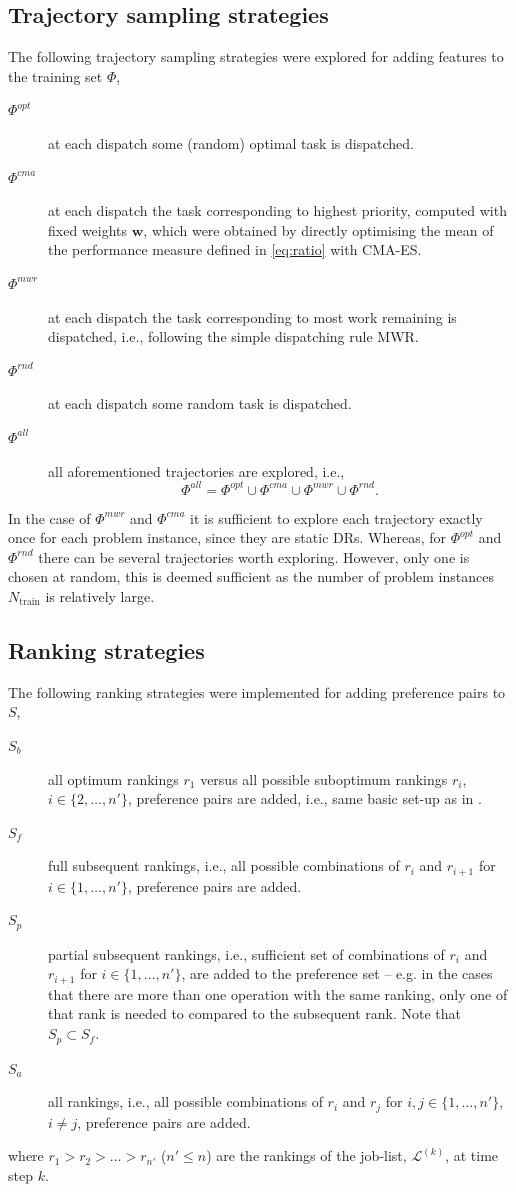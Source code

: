 \documentclass[smallextended]{llncs}
\renewcommand{\vec}[1]{\mathbf{#1}}
\begin{document}
\subsection{Trajectory sampling strategies}\label{sec:tracks}
The following trajectory sampling strategies were explored for adding features to the training set $\Phi$,
\begin{description}
\item[$\Phi^{opt}$] at each dispatch some (random) optimal task is dispatched.
\item[$\Phi^{cma}$] at each dispatch the task corresponding to highest priority, computed with fixed weights $\vec{w}$, which were obtained by directly optimising the mean of the performance measure defined in \cref{eq:ratio} with CMA-ES. 
\item[$\Phi^{mwr}$] at each dispatch the task corresponding to most work remaining is dispatched, i.e., following the simple dispatching rule MWR.
\item[$\Phi^{rnd}$] at each dispatch some random task is dispatched.
\item[$\Phi^{all}$] all aforementioned trajectories are explored, i.e., $$\Phi^{all}=\Phi^{opt}\cup \Phi^{cma}\cup \Phi^{mwr} \cup \Phi^{rnd}.$$
\end{description}
In the case of $\Phi^{mwr}$ and $\Phi^{cma}$ it is sufficient to explore each trajectory exactly once for each problem instance, since they are static DRs. Whereas, for $\Phi^{opt}$ and $\Phi^{rnd}$ there can be several trajectories worth exploring. However, only one is chosen at random, this is deemed sufficient as the number of problem instances $N_{\text{train}}$ is relatively large.

\subsection{Ranking strategies}\label{sec:ranks}
The following ranking strategies were implemented for adding preference pairs to $S$,
\begin{description}
\item[$S_b$] all optimum rankings $r_1$ versus all possible suboptimum rankings $r_i$, $i\in\{2,\ldots,n'\}$, preference pairs are added, i.e., same basic set-up as in \cite{InRu11a}. %
\item[$S_f$] full subsequent rankings, i.e., all possible combinations of $r_i$ and $r_{i+1}$ for $i\in\{1,\ldots,n'\}$, preference pairs are added.
\item[$S_p$] partial subsequent rankings, i.e., sufficient set of combinations of $r_i$ and $r_{i+1}$ for $i\in\{1,\ldots,n'\}$, are added to the preference set -- e.g. in the cases that there are more than one operation with the same ranking, only one of that rank is needed to compared to the subsequent rank. Note that $S_p\subset S_f$.
\item[$S_a$] all rankings, i.e., all possible combinations of $r_i$ and $r_j$ for $i,j\in\{1,\ldots,n'\}$, \mbox{$i\neq j$}, preference pairs are added.
\end{description}
where $r_1>r_2>\ldots>r_{n'}$ ($n'\leq n$) are the rankings of the job-list, $\mathcal{L}^{(k)}$, at time step $k$.
\end{document}
